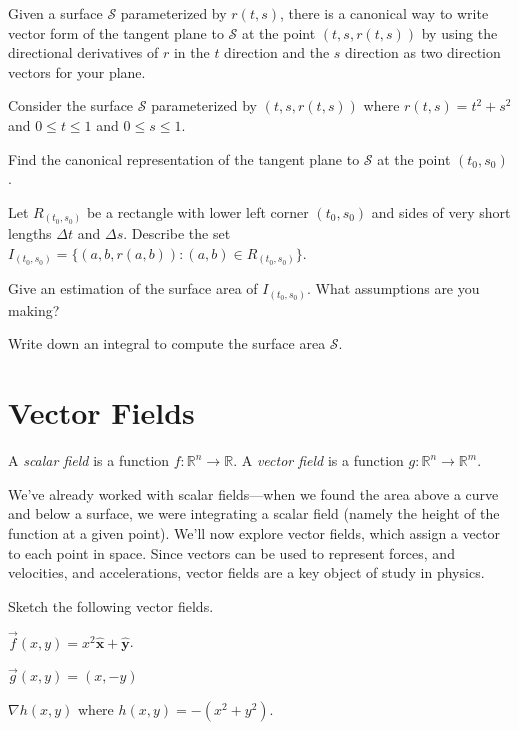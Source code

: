 \documentclass{problemset}
\newcommand{\xh}{{\hat {\mathbf x}}}
\newcommand{\yh}{{\hat {\mathbf y}}}
\newcommand{\R}{\mathbb{R}}
\begin{document}
	Given a surface $\mathcal S$ parameterized by $r(t,s)$, there is a canonical way to write vector form
	of the tangent plane to $\mathcal S$ at the point $(t,s,r(t,s))$ by using the directional derivatives
	of $r$ in the $t$ direction and the $s$ direction as two direction vectors for your plane.
	
	\question
	Consider the surface $\mathcal S$ parameterized by $(t,s,r(t,s))$ where $r(t,s) = t^2+s^2$ and $0\leq t\leq 1$ and $0\leq s\leq 1$.
	\begin{parts}
		\item Find the canonical representation of the tangent plane to $\mathcal S$ at the point
			$(t_0,s_0)$.
		\item Let $R_{(t_0,s_0)}$ be a rectangle with lower left corner $(t_0,s_0)$ and sides of 
			very short lengths $\Delta t$ and $\Delta s$.  Describe the set $I_{(t_0,s_0)}=\{(a,b,r(a,b)): (a,b)\in R_{(t_0,s_0)}\}$.
		\item Give an estimation of the surface area of $I_{(t_0,s_0)}$.  What assumptions are you making?
		\item Write down an integral to compute the surface area $\mathcal S$.
	\end{parts}

\newpage
\section*{Vector Fields}

	\begin{definition}
		A \emph{scalar field} is a function $f:\R^n\to \R$.  A \emph{vector field}
		is a function $g:\R^n\to\R^m$.
	\end{definition}

	We've already worked with scalar fields---when we found the area above a curve and below
	a surface, we were integrating a scalar field (namely the height of the function at a given point).
	We'll now explore vector fields, which assign a vector to each point in space.
	Since vectors can be used to represent forces, and velocities, and accelerations, vector fields are a key object of study in physics.

	\question
	Sketch the following vector fields.
	\begin{parts}
		\item $\vec f(x,y) = x^2\xh +\yh$.
		\item $\vec g(x,y) = (x,-y)$
		\item $\nabla h(x,y)$ where $h(x,y) = -(x^2+y^2)$.
	\end{parts}
\end{document}
